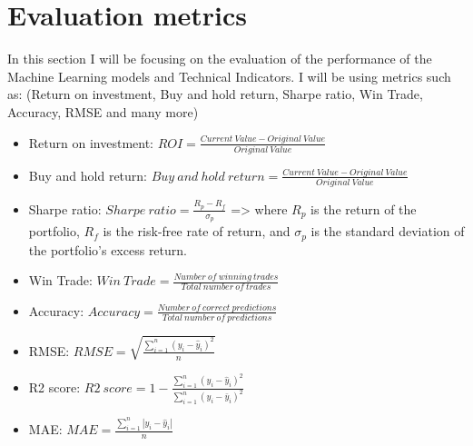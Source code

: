 \documentclass{imc-inf}
\begin{document}
	\section{Evaluation metrics}
		In this section I will be focusing on the evaluation \cite{evaluation_metrics_2} of the performance of the Machine Learning models and Technical Indicators.
		I will be using metrics such as: (Return on investment, Buy and hold return, Sharpe ratio, Win Trade, Accuracy, RMSE and many more)
		\begin{itemize}
			\item Return on investment: $ROI = \frac{Current\ Value - Original\ Value}{Original\ Value}$
			\item Buy and hold return: $Buy\ and\ hold\ return = \frac{Current\ Value - Original\ Value}{Original\ Value}$
			\item Sharpe ratio: $Sharpe\ ratio = \frac{R_p - R_f}{\sigma_p}$ => where $R_p$ is the return of the portfolio, $R_f$ is the risk-free rate of return, and $\sigma_p$ is the standard deviation of the portfolio's excess return.
			\item Win Trade: $Win\ Trade = \frac{Number\ of\ winning\ trades}{Total\ number\ of\ trades}$
			\item Accuracy: $Accuracy = \frac{Number\ of\ correct\ predictions}{Total\ number\ of\ predictions}$
			\item RMSE: $RMSE = \sqrt{\frac{\sum_{i=1}^{n} (y_i - \hat{y}_i)^2}{n}}$
			\item R2 score: $R2\ score = 1 - \frac{\sum_{i=1}^{n} (y_i - \hat{y}_i)^2}{\sum_{i=1}^{n} (y_i - \bar{y}_i)^2}$
			\item MAE: $MAE = \frac{\sum_{i=1}^{n} |y_i - \hat{y}_i|}{n}$
			\end{itemize}
\end{document}
